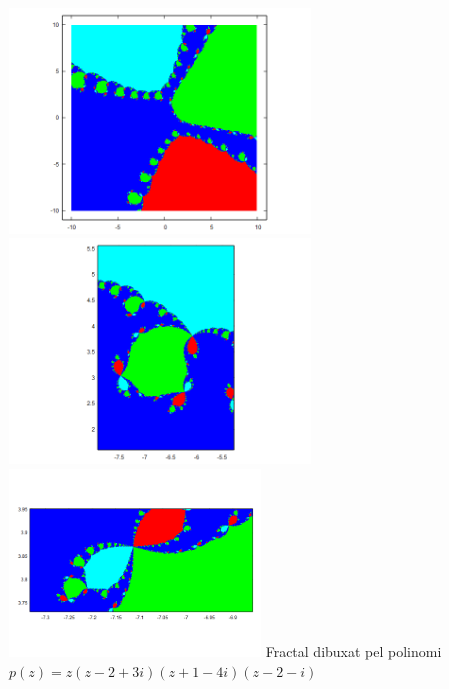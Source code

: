 \documentclass[12pt]{report}
\begin{document}
\begin{center}
    \includegraphics[width=0.6\textwidth]{z4R.png}
    \newline
    \includegraphics[width=0.6\textwidth]{z4R_zoom.png}
    \newline
    \includegraphics[width=0.5\textwidth]{z4R_zoom2.png}
    \newline
\hspace{-6em}Fractal dibuxat pel polinomi $p(z)=z(z-2+3i)(z+1-4i)(z-2-i) $
\label{fig:prodcte arrels}
\end{center}
\newpage
\end{document}
